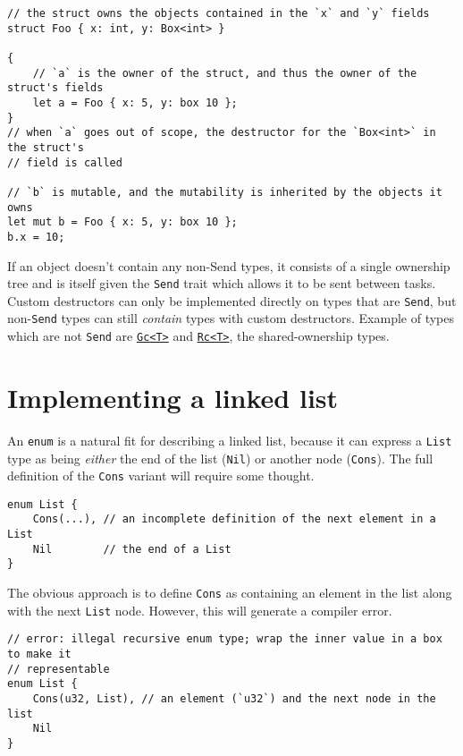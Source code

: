 \documentclass[]{article}
\begin{document}
\begin{verbatim}
// the struct owns the objects contained in the `x` and `y` fields
struct Foo { x: int, y: Box<int> }

{
    // `a` is the owner of the struct, and thus the owner of the struct's fields
    let a = Foo { x: 5, y: box 10 };
}
// when `a` goes out of scope, the destructor for the `Box<int>` in the struct's
// field is called

// `b` is mutable, and the mutability is inherited by the objects it owns
let mut b = Foo { x: 5, y: box 10 };
b.x = 10;
\end{verbatim}

If an object doesn't contain any non-Send types, it consists of a single
ownership tree and is itself given the \texttt{Send} trait which allows
it to be sent between tasks. Custom destructors can only be implemented
directly on types that are \texttt{Send}, but non-\texttt{Send} types
can still \emph{contain} types with custom destructors. Example of types
which are not \texttt{Send} are
\href{http://doc.rust-lang.org/std/gc/struct.Gc.html}{\texttt{Gc\textless{}T\textgreater{}}}
and
\href{http://doc.rust-lang.org/std/rc/struct.Rc.html}{\texttt{Rc\textless{}T\textgreater{}}},
the shared-ownership types.

\section{Implementing a linked list}\label{implementing-a-linked-list}

An \texttt{enum} is a natural fit for describing a linked list, because
it can express a \texttt{List} type as being \emph{either} the end of
the list (\texttt{Nil}) or another node (\texttt{Cons}). The full
definition of the \texttt{Cons} variant will require some thought.

\begin{verbatim}
enum List {
    Cons(...), // an incomplete definition of the next element in a List
    Nil        // the end of a List
}
\end{verbatim}

The obvious approach is to define \texttt{Cons} as containing an element
in the list along with the next \texttt{List} node. However, this will
generate a compiler error.

\begin{verbatim}
// error: illegal recursive enum type; wrap the inner value in a box to make it
// representable
enum List {
    Cons(u32, List), // an element (`u32`) and the next node in the list
    Nil
}
\end{verbatim}
\end{document}

